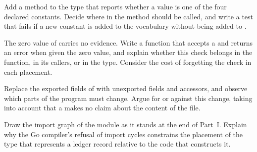 \begin{exercise}
Add a method  to the type  that reports whether a value is one of the four declared constants. Decide where in \golab{} the method should be called, and write a test that fails if a new constant is added to the vocabulary without being added to .
\end{exercise}

\begin{exercise}
The zero value of  carries no evidence. Write a function that accepts a  and returns an error when given the zero value, and explain whether this check belongs in the function, in its callers, or in the type. Consider the cost of forgetting the check in each placement.
\end{exercise}

\begin{exercise}
Replace the exported fields of  with unexported fields and accessors, and observe which parts of the program must change. Argue for or against this change, taking into account that a  makes no claim about the content of the file.
\end{exercise}

\begin{exercise}
Draw the import graph of the \golab{} module as it stands at the end of Part~I. Explain why the Go compiler's refusal of import cycles constrains the placement of the type that represents a ledger record relative to the code that constructs it.
\end{exercise}
